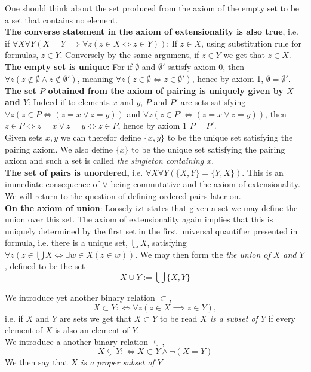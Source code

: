 \begin{remark}
    One should think about the set produced from the axiom of the empty set to be a set that contains no element.\\ \textbf{The converse statement in the axiom of extensionality is also true}, i.e. if $\forall X \forall Y(X=Y\implies \forall z(z\in X\iff z\in Y))$: If $z\in X$, using substitution rule for formulas, $z\in Y$. Conversely by the same argument, if $z\in Y$ we get that $z\in X$.\\
    \textbf{The empty set is unique:} For if $\emptyset$ and $\emptyset'$ satisfy axiom 0, then $\forall z(z\notin \emptyset \wedge z\notin \emptyset')$, meaning $\forall z(z\in \emptyset \iff z\in \emptyset')$, hence by axiom 1, $\emptyset = \emptyset'$.\\
    \textbf{The set $P$ obtained from the axiom of pairing is uniquely given by $X$ and $Y$}: Indeed if to elements $x$ and $y$, $P$ and $P'$ are sets satisfying $\forall z(z\in P \iff (z=x\vee z=y))$ and $\forall z(z\in P' \iff (z=x\vee z=y))$, then $z\in P\iff z=x \vee z=y \iff z\in P$, hence by axiom 1 $P=P'$.\\
    Given sets $x,y$ we can therefor define $\{x,y\}$ to be the unique set satisfying the pairing axiom. We also define $\{x\}$ to be the unique set satisfying the pairing axiom and such a set is called \textit{the singleton containing $x$}.\\
    \textbf{The set of pairs is unordered,} i.e. $\forall X\forall Y(\{X,Y\}=\{Y,X\})$. This is an immediate consequence of $\vee$ being commutative and the axiom of extensionality. We will return to the question of defining ordered pairs later on.\\
    \textbf{On the axiom of union}: Loosely izt states that given a set we may define the union over this set. The axiom of extensionality again implies that this is uniquely determined by the first set in the first universal quantifier presented in formula, i.e. there is a unique set, $\bigcup X$, satisfying $\forall z(z\in \bigcup X \iff \exists w\in X(z\in w))$. We may then form the \textit{the union of $X$ and $Y$}, defined to be the set 
    $$ X\cup Y := \bigcup \{X,Y\}$$
\end{remark}
\begin{definition}
    We introduce yet another binary relation $\subset$,
    $$X \subset Y :\iff \forall z(z\in X \implies z\in Y),$$
    i.e. if $X$ and $Y$ are sets we get that $X\subset Y$ to be read \textit{$X$ is a subset of $Y$} if every element of $X$ is also an element of $Y$.\\
    We introduce a another binary relation $\subsetneq$,
    $$ X\subsetneq Y :\iff X\subset Y \wedge \neg(X=Y)$$
    We then say that \textit{$X$ is a proper subset of $Y$}
\end{definition}
